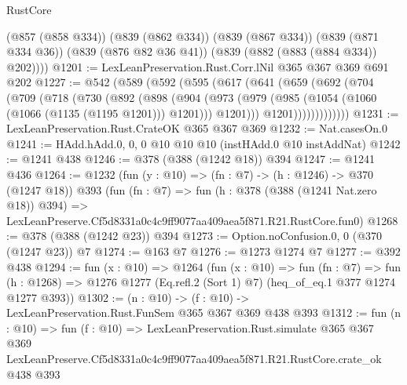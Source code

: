 \begin{lexlean}{RustCore}
\begin{coremodule}
        (@857 (@858 @334))
        (@839 (@862 @334))
        (@839 (@867 @334))
        (@839 (@871 @334 @36))
        (@839 (@876 @82 @36 @41))
        (@839 (@882 (@883 (@884 @334)) @202))))
@1201 := LexLeanPreservation.Rust.Corr.lNil @365 @367 @369 @691 @202
@1227 := @542
    (@589
      (@592
        (@595
          (@617
            (@641
              (@659
                (@692
                  (@704
                    (@709
                      (@718
                        (@730
                          (@892
                            (@898
                              (@904
                                (@973
                                  (@979
                                    (@985 (@1054 (@1060 (@1066 (@1135 (@1195 @1201))) @1201)))
                                    @1201)))
                              @1201)))))))))))))
@1231 := LexLeanPreservation.Rust.CrateOK @365 @367 @369
@1232 := Nat.casesOn.{0}
@1241 := HAdd.hAdd.{0, 0, 0} @10 @10 @10 (instHAdd.{0} @10 instAddNat)
@1242 := @1241 @438
@1246 := @378 (@388 (@1242 @18)) @394
@1247 := @1241 @436
@1264 := @1232
    (fun (y : @10) => (fn : @7) -> (h : @1246) -> @370 (@1247 @18))
    @393
    (fun (fn : @7) =>
    fun (h : @378 (@388 (@1241 Nat.zero @18)) @394) =>
    LexLeanPreserve.Cf5d8331a0c4c9ff9077aa409aea5f871.R21.RustCore.fun0)
@1268 := @378 (@388 (@1242 @23)) @394
@1273 := Option.noConfusion.{0, 0} (@370 (@1247 @23)) @7
@1274 := @163 @7
@1276 := @1273 @1274 @7
@1277 := @392 @438
@1294 := fun (x : @10) =>
  @1264
    (fun (x : @10) =>
    fun (fn : @7) =>
    fun (h : @1268) => @1276 @1277 (Eq.refl.{2} (Sort 1) @7) (heq_of_eq.{1} @377 @1274 @1277 @393))
@1302 := (n : @10) -> (f : @10) -> LexLeanPreservation.Rust.FunSem @365 @367 @369 @438 @393
@1312 := fun (n : @10) =>
  fun (f : @10) =>
  LexLeanPreservation.Rust.simulate
    @365
    @367
    @369
    LexLeanPreserve.Cf5d8331a0c4c9ff9077aa409aea5f871.R21.RustCore.crate_ok
    @438
    @393
\end{coremodule}
\end{lexlean}
